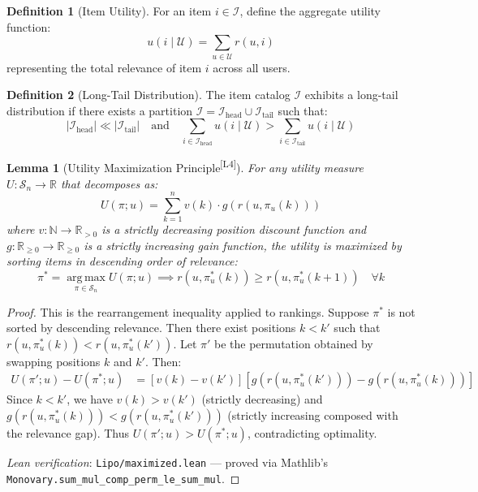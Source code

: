 \documentclass[11pt,a4paper]{article}
\theoremstyle{definition}
\newtheorem{definition}{Definition}[section]
\theoremstyle{plain}
\newtheorem{lemma}[theorem]{Lemma}
\theoremstyle{remark}
\newcommand{\R}{\mathbb{R}}
\newcommand{\argmax}{\operatorname*{arg\,max}}
\newcommand{\leanmark}{\textsuperscript{\textcolor{green!50!black}{[L4]}}}
\begin{document}
\begin{definition}[Item Utility]
\label{def:item_utility}
For an item $i \in \mathcal{I}$, define the aggregate utility function:
\begin{equation}
    u(i \mid \mathcal{U}) = \sum_{u \in \mathcal{U}} r(u, i)
\end{equation}
representing the total relevance of item $i$ across all users.
\end{definition}

\begin{definition}[Long-Tail Distribution]
\label{def:longtail}
The item catalog $\mathcal{I}$ exhibits a long-tail distribution if there exists a partition $\mathcal{I} = \mathcal{I}_{\text{head}} \cup \mathcal{I}_{\text{tail}}$ such that:
\begin{equation}
    |\mathcal{I}_{\text{head}}| \ll |\mathcal{I}_{\text{tail}}| \quad \text{and} \quad \sum_{i \in \mathcal{I}_{\text{head}}} u(i \mid \mathcal{U}) > \sum_{i \in \mathcal{I}_{\text{tail}}} u(i \mid \mathcal{U})
\end{equation}
\end{definition}

\begin{lemma}[Utility Maximization Principle\leanmark]
\label{lem:utility_max}
For any utility measure $U: \mathcal{S}_n \rightarrow \R$ that decomposes as:
\begin{equation}
    U(\pi; u) = \sum_{k=1}^{n} v(k) \cdot g(r(u, \pi_u(k)))
\end{equation}
where $v: \mathbb{N} \rightarrow \R_{>0}$ is a strictly decreasing position discount function and $g: \R_{\geq 0} \rightarrow \R_{\geq 0}$ is a strictly increasing gain function, the utility is maximized by sorting items in descending order of relevance:
\begin{equation}
    \pi^* = \argmax_{\pi \in \mathcal{S}_n} U(\pi; u) \implies r(u, \pi^*_u(k)) \geq r(u, \pi^*_u(k+1)) \quad \forall k
\end{equation}
\end{lemma}

\begin{proof}
This is the rearrangement inequality applied to rankings. Suppose $\pi^*$ is not sorted by descending relevance. Then there exist positions $k < k'$ such that $r(u, \pi^*_u(k)) < r(u, \pi^*_u(k'))$. Let $\pi'$ be the permutation obtained by swapping positions $k$ and $k'$. Then:
\begin{align}
    U(\pi'; u) - U(\pi^*; u) &= [v(k) - v(k')][g(r(u, \pi^*_u(k'))) - g(r(u, \pi^*_u(k)))]
\end{align}
Since $k < k'$, we have $v(k) > v(k')$ (strictly decreasing) and $g(r(u, \pi^*_u(k))) < g(r(u, \pi^*_u(k')))$ (strictly increasing composed with the relevance gap). Thus $U(\pi'; u) > U(\pi^*; u)$, contradicting optimality.

\smallskip
\noindent\textit{Lean verification}: \texttt{Lipo/maximized.lean} --- proved via Mathlib's \texttt{Monovary.sum\_mul\_comp\_perm\_le\_sum\_mul}.
\end{proof}
\end{document}
